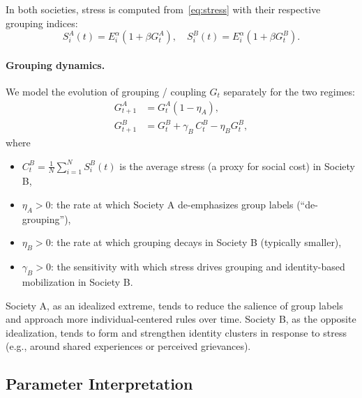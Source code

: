 \documentclass[11pt]{article}
\theoremstyle{plain}
\begin{document}
In both societies, stress is computed from~\eqref{eq:stress} with their respective grouping indices:
\[
S_i^A(t) = E_i^{\alpha} (1 + \beta G_t^A), \quad
S_i^B(t) = E_i^{\alpha} (1 + \beta G_t^B).
\]

\paragraph{Grouping dynamics.}
We model the evolution of grouping / coupling $G_t$ separately for the two regimes:
\begin{align}
G_{t+1}^A &= G_t^A (1 - \eta_A), \label{eq:GA}\\
G_{t+1}^B &= G_t^B + \gamma_B\, C_t^B - \eta_B G_t^B, \label{eq:GB}
\end{align}
where
\begin{itemize}
  \item $C_t^B = \frac{1}{N} \sum_{i=1}^N S_i^B(t)$ is the average stress (a proxy for social cost) in Society B,
  \item $\eta_A > 0$: the rate at which Society A de-emphasizes group labels (``de-grouping''),
  \item $\eta_B > 0$: the rate at which grouping decays in Society B (typically smaller),
  \item $\gamma_B > 0$: the sensitivity with which stress drives grouping and identity-based mobilization in Society B.
\end{itemize}

Society A, as an idealized extreme, tends to reduce the salience of group labels and approach more individual-centered rules over time.
Society B, as the opposite idealization, tends to form and strengthen identity clusters in response to stress (e.g., around shared experiences or perceived grievances).

\subsection{Parameter Interpretation}
\end{document}
